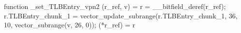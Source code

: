 function _set_TLBEntry_vpn2 (r_ref, v) = {
    r = __bitfield_deref(r_ref);
    r.TLBEntry_chunk_1 = vector_update_subrange(r.TLBEntry_chunk_1, 36, 10, vector_subrange(v, 26, 0));
    (*r_ref) = r
}
